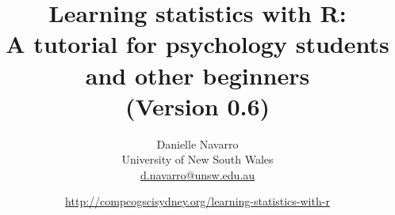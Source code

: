 

\date{\url{http://compcogscisydney.org/learning-statistics-with-r} \hfill \\ }
\title{Learning statistics with R: \\ A tutorial for psychology students and other beginners \vspace*{12pt}
\\ (Version 0.6) \\ \vspace*{24pt}}
\author{Danielle Navarro \\ University of New South Wales \\ \url{d.navarro@unsw.edu.au} \vspace*{36pt}}


 